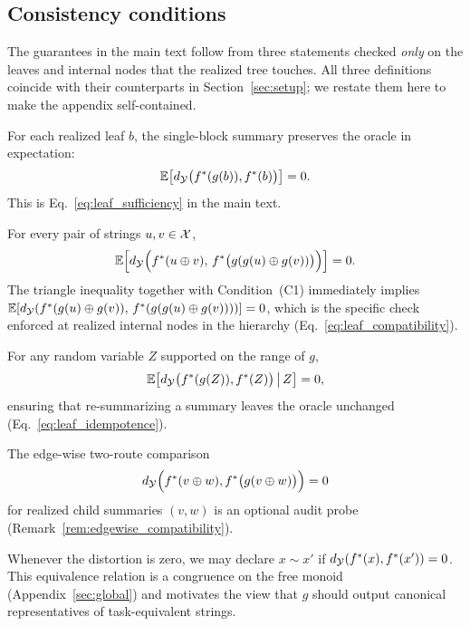 \subsection{Consistency conditions}
The guarantees in the main text follow from three statements checked \emph{only} on the leaves and internal nodes that the realized tree touches. All three definitions coincide with their counterparts in Section~\ref{sec:setup}; we restate them here to make the appendix self-contained.

\begin{definition}
For each realized leaf $b$, the single-block summary preserves the oracle in expectation:
\[
\mathbb{E}\big[d_{\mathcal{Y}}\big(f^{\ast}(g(b)),f^{\ast}(b)\big)\big]=0.
\]
This is Eq.~\eqref{eq:leaf_sufficiency} in the main text.
\end{definition}

\begin{definition}
For every pair of strings $u,v\in\mathcal{X}$,
\[
\mathbb{E}\Big[d_{\mathcal{Y}}\Big(f^{\ast}(u\oplus v),\,f^{\ast}\big(g(g(u)\oplus g(v))\big)\Big)\Big]=0.
\]
The triangle inequality together with Condition~(C1) immediately implies $\mathbb{E}[d_{\mathcal{Y}}(f^{\ast}(g(u)\oplus g(v)),\,f^{\ast}(g(g(u)\oplus g(v))))]=0$, which is the specific check enforced at realized internal nodes in the hierarchy (Eq.~\eqref{eq:leaf_compatibility}).
\end{definition}

\begin{definition}
For any random variable $Z$ supported on the range of $g$,
\[
\mathbb{E}\big[d_{\mathcal{Y}}\big(f^{\ast}(g(Z)),f^{\ast}(Z)\big)\,\big|\,Z\big]=0,
\]
ensuring that re-summarizing a summary leaves the oracle unchanged (Eq.~\eqref{eq:leaf_idempotence}).
\end{definition}

The edge-wise two-route comparison
\[
d_{\mathcal{Y}}\Big(f^{\ast}(v\oplus w),f^{\ast}\big(g(v\oplus w)\big)\Big)=0
\]
for realized child summaries $(v,w)$ is an optional audit probe (Remark~\ref{rem:edgewise_compatibility}).

\begin{remark}
Whenever the distortion is zero, we may declare $x\sim x'$ if $d_{\mathcal{Y}}(f^{\ast}(x),f^{\ast}(x'))=0$. This equivalence relation is a congruence on the free monoid (Appendix~\ref{sec:global}) and motivates the view that $g$ should output canonical representatives of task-equivalent strings.
\end{remark}

